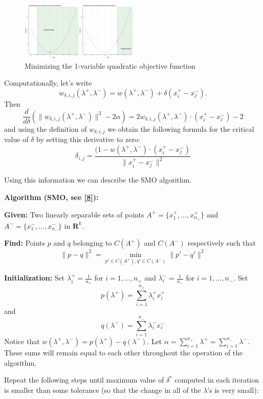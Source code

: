 \documentclass[
  oneside]{scrbook}
\begin{document}
\begin{figure}
\hypertarget{fig:quadratics}{%
\centering
\includegraphics[width=0.5\textwidth,height=\textheight]{img/quadratic.png}
\caption{Minimizing the 1-variable quadratic objective
function}\label{fig:quadratics}
}
\end{figure}

Computationally, let's write \[
w_{\delta,i,j}(\lambda^{+},\lambda^{-}) = w(\lambda^{+},\lambda^{-})+\delta(x^{+}_{i}-x^{-}_{j}).
\] Then \[
\frac{d}{d\delta}(\|w_{\delta,i,j}(\lambda^{+},\lambda^{-})\|^2-2\alpha)  = 2w_{\delta,i,j}(\lambda^{+},\lambda^{-})\cdot(x^{+}_{i}-x^{-}_{j})-2
\] and using the definition of \(w_{\delta,i,j}\) we obtain the
following formula for the critical value of \(\delta\) by setting this
derivative to zero: \[
\delta_{i,j} = \frac{(1-w(\lambda^{+},\lambda^{-})\cdot(x_{i}^{+}-x_{j}^{-})}{\|x^+_{i}-x^{-}_{j}\|^2}
\]

Using this information we can describe the SMO algorithm.

\textbf{Algorithm (SMO, see {[}\protect\hyperlink{ref-plattSMO}{8}{]}):}

\textbf{Given:} Two linearly separable sets of points
\(A^{+}=\{x_{1}^{+},\ldots,x_{n_{+}}^{+}\}\) and
\(A^{-}=\{x_{1}^{-},\ldots, x_{n_{-}}^{-}\}\) in \(\mathbf{R}^{k}\).

\textbf{Find:} Points \(p\) and \(q\) belonging to \(C(A^{+})\) and
\(C(A^{-})\) respectively such that \[
\|p-q\|^2=\min_{p'\in C(A^{+}),q'\in C(A^{-})} \|p'-q'\|^2
\]

\textbf{Initialization:} Set \(\lambda_{i}^{+}=\frac{1}{n_{+}}\) for
\(i=1,\ldots, n_{+}\) and \(\lambda_{i}^{-}=\frac{1}{n_{-}}\) for
\(i=1,\ldots, n_{-}\). Set \[
p(\lambda^{+})=\sum_{i=1}^{n_{+}}\lambda^{+}_{i}x^{+}_{i}
\] and \[
q(\lambda^{-})=\sum_{i=1}^{n_{-}}\lambda^{-}_{i}x^{-}_{i}
\] Notice that
\(w(\lambda^{+},\lambda^{-})=p(\lambda^{+})-q(\lambda^{-})\). Let
\(\alpha=\sum_{i=1}^{n_{+}}\lambda^{+}=\sum_{i=1}^{n_{-}}\lambda^{-}\).
These sums will remain equal to each other throughout the operation of
the algorithm.

Repeat the following steps until maximum value of \(\delta^{*}\)
computed in each iteration is smaller than some tolerance (so that the
change in all of the \(\lambda\)'s is very small):
\end{document}
